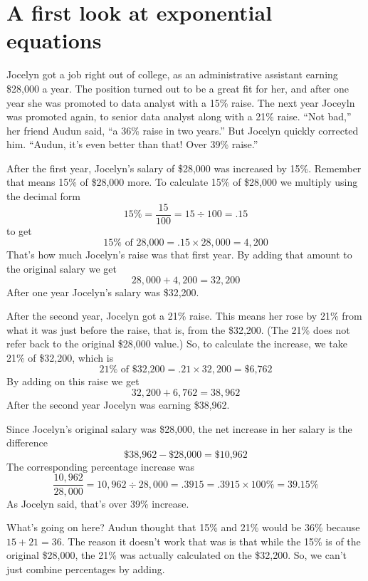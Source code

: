 

\section{A first look at exponential equations}

Jocelyn got a job right out of college, as an administrative assistant earning \$28,000 a year.  The position turned out to be a great fit for her, and after one year she was promoted to data analyst with a 15\% raise.  The next year Joceyln was promoted again, to senior data analyst along with a 21\% raise.  ``Not bad,'' her friend Audun said, ``a 36\% raise in two years.''  But Jocelyn quickly corrected him.  ``Audun, it's even better than that!  Over 39\% raise.''

After the first year, Jocelyn's salary of \$28,000 was increased by 15\%.  Remember that means 15\% of \$28,000 more.  To calculate 15\% of \$28,000 we multiply using the decimal form 
$$15\% = \frac{15}{100} = 15 \div 100 = .15$$
to get 
$$15\% \text{ of  28,000} = .15 \times 28,000 = 4,200$$
  That's how much Jocelyn's raise was that first year.  By adding that amount to the original salary we get 
  $$28,000 + 4,200 = 32,200$$
After one year Jocelyn's salary was \${32,200}.

After the second year, Jocelyn got a 21\% raise.  This means her rose by 21\% from what it was just before the raise, that is, from the \$32,200.  (The 21\% does not refer back to the original \$28,000 value.)  So, to calculate the increase, we take 21\% of \$32,200, which is 
$$21\% \text{ of  \$32,200} = .21 \times 32,200 = \text{\$6,762}$$  
By adding on this raise we get 
$$32,200+ 6,762 = 38,962$$  
After the second year Jocelyn was earning \$38,962.

Since Jocelyn's original salary was \$28,000, the net increase in her salary is the difference 
$$\text{\$38,962} - \text{\$28,000} = \text{\$10,962}$$ The corresponding percentage increase was 
$$\frac{10,962}{28,000}= 10,962 \div 28,000 = .3915 = .3915 \times 100\% = 39.15\%$$  
As Jocelyn said, that's over 39\% increase.  

What's going on here? Audun thought that 15\% and 21\% would be 36\% because $15 + 21 = 36$.
The reason it doesn't work that was is that while the 15\% is of the original \$28,000, the 21\% was actually calculated on the \$32,200.  So, we can't just combine percentages by adding.

